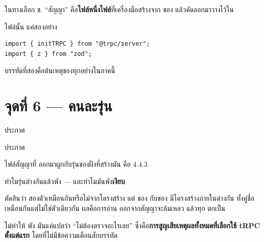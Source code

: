ในทางเลือก ข. ``สัญญา'' คือ\textbf{ไฟล์หนึ่งไฟล์}ที่เครื่องมือสร้างจาก 
ของ  แล้วคัดลอกมาวางไว้ใน 

ไฟล์นั้น  แค่สองอย่าง

\begin{lstlisting}
import { initTRPC } from "@trpc/server";
import { z } from "zod";
\end{lstlisting}

บรรทัดที่สองคือต้นเหตุของทุกอย่างในภาคนี้

\section{จุดที่ 6 ---  คนละรุ่น}
\label{sec:zod}

\begin{badbox}[title={\pone\ ตัวบล็อกที่เจอตั้งแต่ยังไม่เขียนโค้ดบรรทัดแรก}]
 ประกาศ 

 ประกาศ 

ไฟล์สัญญาที่  ออกมาผูกกับรุ่นของฝั่งที่สร้างมัน คือ 4.4.3
\end{badbox}

ทำไมรุ่นต่างกันแล้วพัง --- และทำไมมันพัง\textbf{เงียบ}

 ตัดสินว่า  สองตัวเหมือนกันหรือไม่จากโครงสร้าง
แต่  ของ  กับของ  มีโครงสร้างภายในต่างกัน
ทั้งคู่ชื่อ  เหมือนกันแต่ไม่ใช่ตัวเดียวกัน ผลคือการอ่าน 
ออกจากสัญญาจะล้มเหลว แล้วทุก  ตกเป็น 

 ไม่ทำให้  พัง มันแค่แปลว่า ``ไม่ต้องตรวจอะไรเลย''
ซึ่งคือ\textbf{การสูญเสียเหตุผลทั้งหมดที่เลือกใช้ tRPC ตั้งแต่แรก}
โดยที่ไม่มีข้อความเตือนสักบรรทัด

